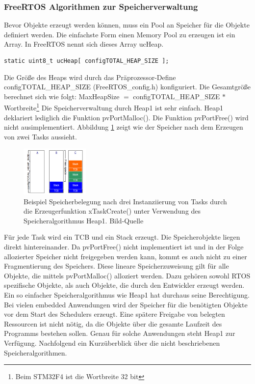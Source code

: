 \subsubsection{FreeRTOS Algorithmen zur Speicherverwaltung}
Bevor Objekte erzeugt werden können, muss ein Pool an Speicher für die Objekte definiert werden. Die einfachste Form einen Memory Pool zu erzeugen ist ein Array. In FreeRTOS nennt sich dieses Array ucHeap.
\begin{lstlisting}[numbers = none]
static uint8_t ucHeap[ configTOTAL_HEAP_SIZE ];
\end{lstlisting}
Die Größe des Heaps wird durch das Prä\-pro\-zes\-sor-Define configTOTAL\_HEAP\_SIZE (FreeRTOS\_config.h) konfiguriert. Die Gesamtgröße berechnet sich wie folgt:
\newline
\newline
MaxHeapSize $=$ configTOTAL\_HEAP\_SIZE $\ast$ Wortbreite\footnote{Beim STM32F4 ist die Wortbreite 32 bit} 
\newline
\newline
Die Speicherverwaltung durch Heap1 ist sehr einfach.\newline 
Heap1 deklariert lediglich die Funktion pvPortMalloc(). Die Funktion pvPortFree() wird nicht ausimplementiert. Abbildung \ref{fig:Heap1} zeigt wie der Speicher nach dem Erzeugen von zwei Tasks aussieht. 
\begin{figure}[htb]
	\centering
		\includegraphics[width=0.3\textwidth]{Pictures/FreeRTOSOrg/heap1Alg.png}
	\caption{Beispiel Speicherbelegung nach drei Instanziierung von Tasks durch die Erzeugerfunktion xTaskCreate() unter Verwendung des Speicheralgorithmus Heap1. Bild-Quelle~\protect{}}
	\label{fig:Heap1}
\end{figure}
Für jede Task wird ein TCB und ein Stack erzeugt. Die Speicherobjekte liegen direkt hintereinander. Da pvPortFree() nicht implementiert ist und in der Folge allozierter Speicher nicht freigegeben werden kann, kommt es auch nicht zu einer Fragmentierung des Speichers. Diese lineare Speicherzuweisung gilt für alle Objekte, die mittels pvPortMalloc() alloziert werden. Dazu gehören sowohl RTOS spezifische Objekte, als auch Objekte, die durch den Entwickler erzeugt werden. Ein so einfacher Speicheralgorithmus wie Heap1 hat durchaus seine Berechtigung. Bei vielen embedded Anwendungen wird der Speicher für die benötigten Objekte vor dem Start des Schedulers erzeugt. Eine spätere Freigabe von belegten Ressourcen ist nicht nötig, da die Objekte über die gesamte Laufzeit des Programms bestehen sollen. Genau für solche Anwendungen steht Heap1 zur Verfügung. Nachfolgend ein Kurz\-über\-blick über die nicht beschriebenen Speicheralgorithmen.  
